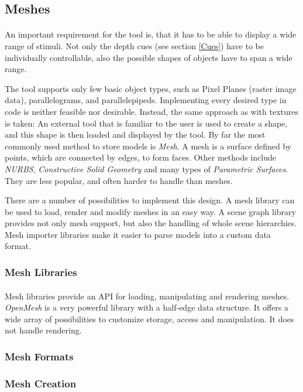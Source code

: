 \subsection{Meshes\label{Meshes}}
\paragraph{}
An important requirement for the tool is, that it has to be able to display a wide range of stimuli. Not only the depth cues (see section \ref{Cues}) have to be individually controllable, also the possible shapes of objects have to span a wide range.

The tool supports only few basic object types, such as Pixel Planes (raster image data), parallelograms, and parallelepipeds. Implementing every desired type in code is neither feasible nor desirable.
Instead, the same approach as with textures is taken: An external tool that is familiar to the user is used to create a shape, and this shape is then loaded and displayed by the tool. By far the most commonly used method to store models is \textit{Mesh}. A mesh is a surface defined by points, which are connected by edges, to form faces. Other methods include \textit{NURBS}, \textit{Constructive Solid Geometry} and many types of \textit{Parametric Surfaces}. They are less popular, and often harder to handle than meshes.

There are a number of possibilities to implement this design. A mesh library can be used to load, render and modify meshes in an easy way. A scene graph library provides not only mesh support, but also the handling of whole scene hierarchies. Mesh importer libraries make it easier to parse models into a custom data format.


\subsubsection{Mesh Libraries}
\paragraph{}
Mesh libraries provide an API for loading, manipulating and rendering meshes. \textit{OpenMesh} is a very powerful library with a half-edge data structure. It offers a wide array of possibilities to customize storage, access and manipulation. It does not handle rendering.

\paragraph{}

\subsubsection{Mesh Formats}
\paragraph{}

\subsubsection{Mesh Creation}
\paragraph{}
